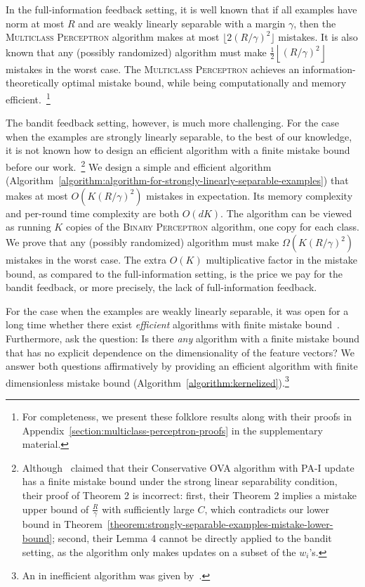 In the full-information feedback setting, it is well known
\citep{Crammer-Singer-2003} that if all examples have norm at most $R$ and are
weakly linearly separable with a margin $\gamma$, then the \textsc{Multiclass
Perceptron} algorithm makes at most $\lfloor 2(R/\gamma)^2 \rfloor$ mistakes. It
is also known that any (possibly randomized) algorithm must make $\frac{1}{2}
\left\lfloor (R/\gamma)^2 \right \rfloor$ mistakes in the worst case. The
\textsc{Multiclass Perceptron} achieves an information-theoretically optimal
mistake bound, while being computationally and memory efficient.~\footnote{For
completeness, we present these folklore results along with their proofs in
Appendix~\ref{section:multiclass-perceptron-proofs} in the supplementary
material.}

The bandit feedback setting, however, is much more challenging. For the case
when the examples are strongly linearly separable, to the best of our knowledge,
it is not known how to design an efficient algorithm with a finite mistake bound
before our work.~\footnote{Although~\cite{Chen-Chen-Zhang-Chen-Zhang-2009}
claimed that their Conservative OVA algorithm with PA-I update has a finite
mistake bound under the strong linear separability condition, their proof of
Theorem 2 is incorrect: first, their Theorem 2 implies a mistake upper bound of
$\frac{R}{\gamma}$ with sufficiently large $C$, which contradicts our lower
bound in Theorem~\ref{theorem:strongly-separable-examples-mistake-lower-bound};
second, their Lemma 4 cannot be directly applied to the bandit setting, as the
algorithm only makes updates on a subset of the $w_i$'s.} We design a simple and
efficient algorithm
(Algorithm~\ref{algorithm:algorithm-for-strongly-linearly-separable-examples})
that makes at most $O(K (R/\gamma)^2)$ mistakes in expectation. Its memory
complexity and per-round time complexity are both $O(dK)$. The algorithm can be
viewed as running $K$ copies of the \textsc{Binary Perceptron} algorithm, one
copy for each class. We prove that any (possibly randomized) algorithm must make
$\Omega(K (R/\gamma)^2)$ mistakes in the worst case. The extra $O(K)$
multiplicative factor in the mistake bound, as compared to the full-information
setting, is the price we pay for the bandit feedback, or more precisely, the
lack of full-information feedback.

For the case when the examples are weakly linearly separable, it was open for a
long time whether there exist \textit{efficient} algorithms with finite mistake
bound~\cite{Kakade-Shalev-Shwartz-Tewari-2008, Beygelzimer-Orabona-Zhang-2017}.
Furthermore, \citet{Kakade-Shalev-Shwartz-Tewari-2008} ask the question:
Is there \textit{any} algorithm with a finite mistake bound that has no explicit
dependence on the dimensionality of the feature vectors? We answer both
questions affirmatively by providing an efficient algorithm with finite
dimensionless mistake bound (Algorithm~\ref{algorithm:kernelized}).\footnote{An
in inefficient algorithm was given by~\cite{Daniely-Helbertal-2013}.}

